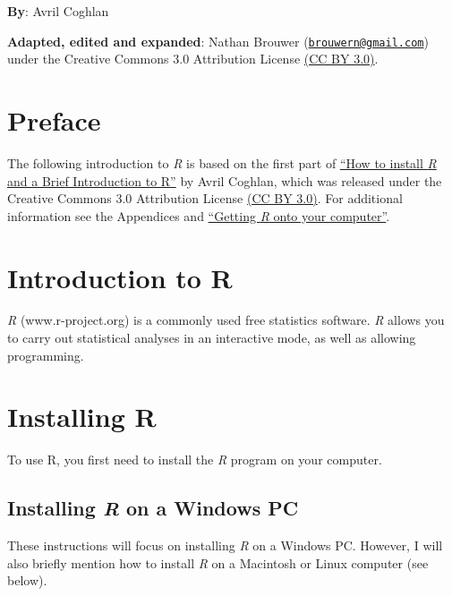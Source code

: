 \documentclass[
]{book}
\begin{document}
\textbf{By}: Avril Coghlan

\textbf{Adapted, edited and expanded}: Nathan Brouwer (\href{mailto:brouwern@gmail.com}{\nolinkurl{brouwern@gmail.com}}) under the Creative Commons 3.0 Attribution License \href{https://creativecommons.org/licenses/by/3.0/}{(CC BY 3.0)}.

\hypertarget{preface}{%
\section{Preface}\label{preface}}

The following introduction to \emph{R} is based on the first part of \href{https://a-little-book-of-r-for-bioinformatics.readthedocs.io/en/latest/src/installr.html}{``How to install \emph{R} and a Brief Introduction to R''} by Avril Coghlan, which was released under the Creative Commons 3.0 Attribution License \href{https://creativecommons.org/licenses/by/3.0/}{(CC BY 3.0)}. For additional information see the Appendices and \href{https://brouwern.github.io/BOOK_R_Ecological_Data_Science/getting-r-onto-your-computer.html}{``Getting \emph{R} onto your computer''}.

\hypertarget{introduction-to-r}{%
\section{Introduction to R}\label{introduction-to-r}}

\emph{R} (www.r-project.org) is a commonly used free statistics software. \emph{R} allows you to carry out statistical analyses in an interactive mode, as well as allowing programming.

\hypertarget{installing-r}{%
\section{Installing R}\label{installing-r}}

To use R, you first need to install the \emph{R} program on your computer.

\hypertarget{installing-r-on-a-windows-pc}{%
\subsection{\texorpdfstring{Installing \emph{R} on a Windows PC}{Installing R on a Windows PC}}\label{installing-r-on-a-windows-pc}}

These instructions will focus on installing \emph{R} on a Windows PC. However, I will also briefly mention how to install \emph{R} on a Macintosh or Linux computer (see below).
\end{document}
